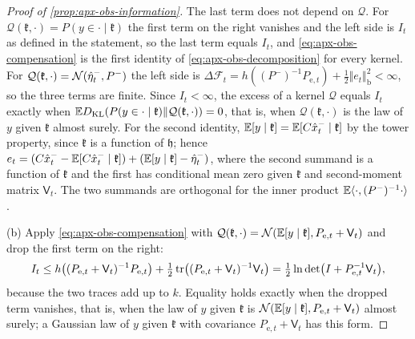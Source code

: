 \begin{proof}[Proof of \cref{prop:apx-obs-information}]
The last term does not depend on $\mathcal Q$. For $\mathcal Q(\mathfrak k,\cdot)=P(y\in\cdot\mid\mathfrak k)$ the first term on the right vanishes and the left side is $I_t$ as defined in the statement, so the last term equals $I_t$, and \eqref{eq:apx-obs-compensation} is the first identity of \eqref{eq:apx-obs-decomposition} for every kernel. For $\mathcal Q(\mathfrak k,\cdot)=\mathcal{N}(\hat\eta^-_t,P^-)$ the left side is $\Delta\mathcal F_t=h((P^-)^{-1}P_{\mathrm e,t})+\frac12\Vert e_t\Vert_{\mathrm b}^2<\infty$, so the three terms are finite. Since $I_t<\infty$, the excess of a kernel $\mathcal Q$ equals $I_t$ exactly when $\mathbb{E}D_{\mathrm{KL}}(P(y\in\cdot\mid\mathfrak k)\Vert\mathcal Q(\mathfrak k,\cdot))=0$, that is, when $\mathcal Q(\mathfrak k,\cdot)$ is the law of $y$ given $\mathfrak k$ almost surely. For the second identity, $\mathbb{E}[y\mid\mathfrak k]=\mathbb{E}[C\hat x^-_t\mid\mathfrak k]$ by the tower property, since $\mathfrak k$ is a function of $\mathfrak h$; hence $e_t=(C\hat x^-_t-\mathbb{E}[C\hat x^-_t\mid\mathfrak k])+(\mathbb{E}[y\mid\mathfrak k]-\hat\eta^-_t)$, where the second summand is a function of $\mathfrak k$ and the first has conditional mean zero given $\mathfrak k$ and second-moment matrix $\mathsf V_t$. The two summands are orthogonal for the inner product $\mathbb{E}\langle\cdot,(P^-)^{-1}\cdot\rangle$.

(b) Apply \eqref{eq:apx-obs-compensation} with $\mathcal Q(\mathfrak k,\cdot)=\mathcal{N}(\mathbb{E}[y\mid\mathfrak k],P_{\mathrm e,t}+\mathsf V_t)$ and drop the first term on the right:
\begin{equation*}
I_t\le h\bigl((P_{\mathrm e,t}+\mathsf V_t)^{-1}P_{\mathrm e,t}\bigr)+\tfrac12\operatorname{tr}\bigl((P_{\mathrm e,t}+\mathsf V_t)^{-1}\mathsf V_t\bigr)=\tfrac12\ln\det\bigl(I+P_{\mathrm e,t}^{-1}\mathsf V_t\bigr),
\end{equation*}
because the two traces add up to $k$. Equality holds exactly when the dropped term vanishes, that is, when the law of $y$ given $\mathfrak k$ is $\mathcal{N}(\mathbb{E}[y\mid\mathfrak k],P_{\mathrm e,t}+\mathsf V_t)$ almost surely; a Gaussian law of $y$ given $\mathfrak k$ with covariance $P_{\mathrm e,t}+\mathsf V_t$ has this form.


\end{proof}
